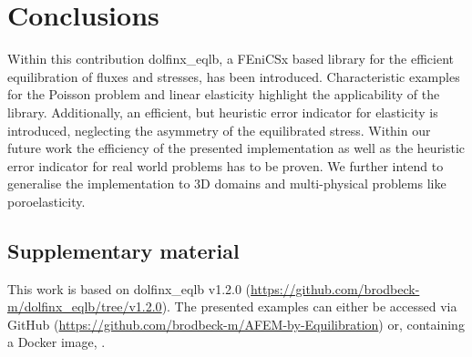\section*{Conclusions}
Within this contribution dolfinx\_eqlb, a FEniCSx based library for the efficient equilibration of fluxes and stresses, has been introduced. 
Characteristic examples for the Poisson problem and linear elasticity highlight the applicability of the library.
Additionally, an efficient, but heuristic error indicator for elasticity is introduced, neglecting the asymmetry of the equilibrated stress.
Within our future work the efficiency of the presented implementation as well as the heuristic error indicator for real world problems has to be proven. 
We further intend to generalise the implementation to 3D domains and multi-physical problems like poroelasticity.
\vspace{-0.1cm}
\subsection*{Supplementary material}
This work is based on dolfinx\_eqlb v1.2.0 (\url{https://github.com/brodbeck-m/dolfinx_eqlb/tree/v1.2.0}). 
The presented examples can either be accessed via GitHub (\url{https://github.com/brodbeck-m/AFEM-by-Equilibration}) or, containing a Docker image, \cite{DatsetPaper}.
\vspace{-0.1cm}




